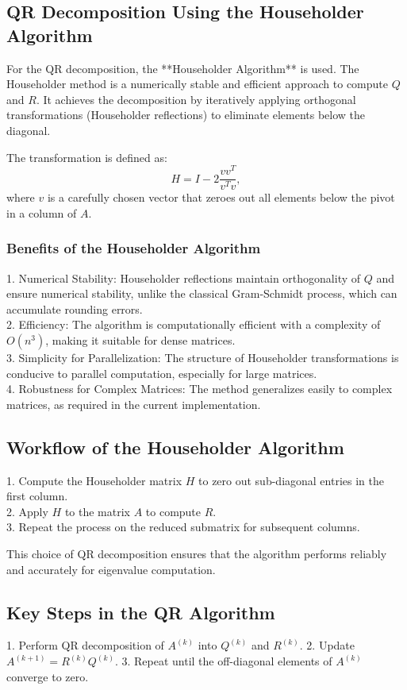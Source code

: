 \documentclass[12pt]{article}
\begin{document}
\subsection*{QR Decomposition Using the Householder Algorithm}
For the QR decomposition, the **Householder Algorithm** is used. The Householder method is a numerically stable and efficient approach to compute \( Q \) and \( R \). It achieves the decomposition by iteratively applying orthogonal transformations (Householder reflections) to eliminate elements below the diagonal.

The transformation is defined as:
\begin{equation}
    H = I - 2\frac{vv^T}{v^Tv},
\end{equation}
where \( v \) is a carefully chosen vector that zeroes out all elements below the pivot in a column of \( A \).

\subsubsection*{Benefits of the Householder Algorithm}
1. Numerical Stability: Householder reflections maintain orthogonality of \( Q \) and ensure numerical stability, unlike the classical Gram-Schmidt process, which can accumulate rounding errors.\\
2. Efficiency: The algorithm is computationally efficient with a complexity of \( O(n^3) \), making it suitable for dense matrices.\\
3. Simplicity for Parallelization: The structure of Householder transformations is conducive to parallel computation, especially for large matrices.\\
4. Robustness for Complex Matrices: The method generalizes easily to complex matrices, as required in the current implementation.

\subsection*{Workflow of the Householder Algorithm}
1. Compute the Householder matrix \( H \) to zero out sub-diagonal entries in the first column.\\
2. Apply \( H \) to the matrix \( A \) to compute \( R \).\\
3. Repeat the process on the reduced submatrix for subsequent columns.

This choice of QR decomposition ensures that the algorithm performs reliably and accurately for eigenvalue computation.
\subsection*{Key Steps in the QR Algorithm}
1. Perform QR decomposition of \( A^{(k)} \) into \( Q^{(k)} \) and \( R^{(k)} \).
2. Update \( A^{(k+1)} = R^{(k)} Q^{(k)} \).
3. Repeat until the off-diagonal elements of \( A^{(k)} \) converge to zero.
\end{document}
